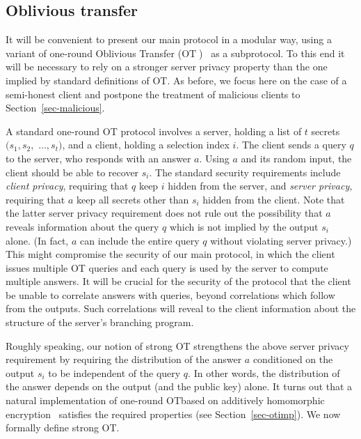 \documentclass[11pt]{article}
\newcommand{\ot}{\mbox{OT}\;}
\newcommand{\otns}{\mbox{OT}}
\begin{document}
\subsection{Oblivious transfer} \label{sec-ot} It will be
convenient to present our main protocol in a modular way, using a
variant of one-round Oblivious Transfer ($\ot$)~\cite{Ra,EGL} as a
subprotocol. To this end it will be necessary to rely on a stronger
server privacy property than the one implied by standard definitions
of \otns. As before, we focus here on the case of a semi-honest client
and postpone the treatment of malicious clients to
Section~\ref{sec-malicious}.

A standard one-round OT protocol involves a server, holding a list of
$t$ secrets $(s_1,s_2,$ $\ldots,s_t)$, and a client, holding a
selection index $i$. The client sends a query $q$ to the server, who
responds with an answer $a$. Using $a$ and its random input, the
client should be able to recover $s_i$. The standard security
requirements include {\em client privacy}, requiring that $q$ keep
$i$ hidden from the server, and {\em server privacy,} requiring that
$a$ keep all secrets other than $s_i$ hidden from the client. Note
that the latter server privacy requirement does not rule out the
possibility that $a$ reveals information about the query $q$ which is
not implied by the output $s_i$ alone. (In fact, $a$ can include the
entire query $q$ without violating server privacy.) This might
compromise the security of our main protocol, in which the client
issues multiple OT queries and each query is used by the server to
compute multiple answers. It will be crucial for the security of the
protocol that the client be unable to correlate answers with queries,
beyond correlations which follow from the outputs. Such correlations
will reveal to the client information about the structure of the
server's branching program.

Roughly speaking, our notion of strong OT strengthens the above
server privacy requirement by requiring the distribution of the
answer $a$  conditioned on the output $s_i$ to be independent of the
query $q$. In other words, the distribution of the answer depends on
the output (and the public key) alone. It turns out that a natural
implementation of one-round \otns based on additively homomorphic
encryption~\cite{KO97,Ste98} satisfies the required properties (see
Section~\ref{sec-otimp}). We now formally define strong \otns.
\end{document}
